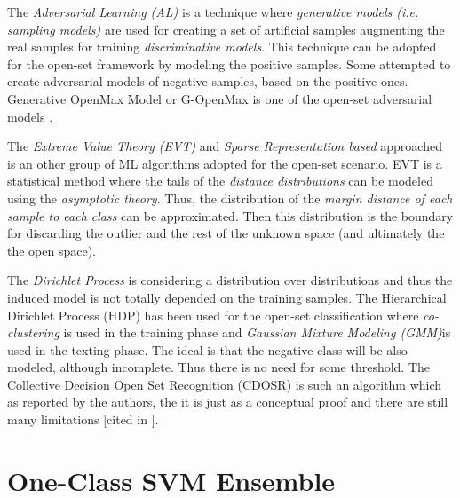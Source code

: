 The \textit{Adversarial Learning (AL)} is a technique where \textit{generative models (i.e. sampling models)} are used for creating a set of artificial samples augmenting the real samples for training \textit{discriminative models}. This technique can be adopted for the open-set framework by modeling the positive samples. Some attempted to create adversarial models of negative samples, based on the positive ones. Generative OpenMax Model or G-OpenMax is one of the open-set adversarial models \parencite{geng2018recent}.

The \textit{Extreme Value Theory (EVT)} and \textit{Sparse Representation based} approached is an other group of ML algorithms adopted for the open-set scenario. EVT is a statistical method where the tails of the \textit{distance distributions} can be modeled using the \textit{asymptotic theory}. Thus, the distribution of the \textit{margin distance of each sample to each class} can be approximated. Then this distribution is the boundary for discarding the outlier and the rest of the unknown space (and ultimately the the open space).


The \textit{Dirichlet Process} is considering a distribution over distributions and thus the induced model is not totally depended on the training samples. The Hierarchical Dirichlet Process (HDP) has been used for the open-set classification where \textit{co-clustering} is used in the training phase and \textit{Gaussian Mixture Modeling (GMM)}is used in the texting phase. The ideal is that the negative class will be also modeled, although incomplete. Thus there is no need for some threshold. The Collective Decision Open Set Recognition (CDOSR) is such an algorithm which as reported by the authors, the it is just as a conceptual proof and there are still many limitations \parencite{geng2018collective} [cited in \parencite{geng2018recent}].

\section{One-Class SVM Ensemble}\label{chap:openset:sec:OCSVM_description}

